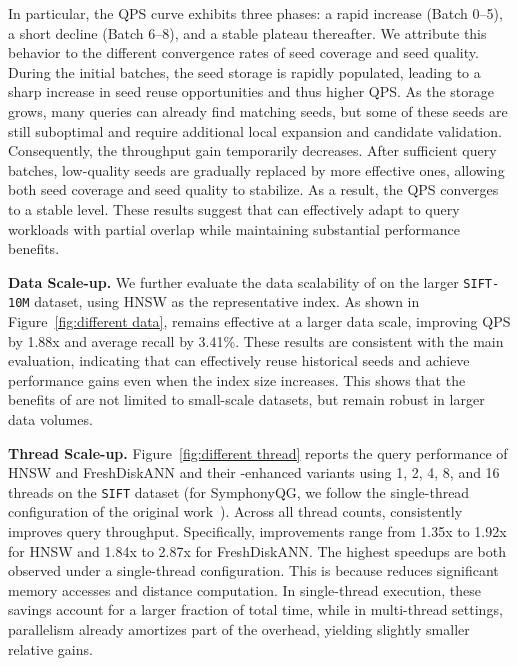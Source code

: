 In particular, the QPS curve exhibits three phases: a rapid increase (Batch 0--5), a short decline (Batch 6--8), and a stable plateau thereafter. We attribute this behavior to the different convergence rates of seed coverage and seed quality. During the initial batches, the seed storage is rapidly populated, leading to a sharp increase in seed reuse opportunities and thus higher QPS. As the storage grows, many queries can already find matching seeds, but some of these seeds are still suboptimal and require additional local expansion and candidate validation. Consequently, the throughput gain temporarily decreases. After sufficient query batches, low-quality seeds are gradually replaced by more effective ones, allowing both seed coverage and seed quality to stabilize. As a result, the QPS converges to a stable level. These results suggest that \system can effectively adapt to query workloads with partial overlap while maintaining substantial performance benefits.



\noindent \textbf{Data Scale-up.} We further evaluate the data scalability of \system on the larger \texttt{SIFT-10M} dataset, using HNSW as the representative index. As shown in Figure~\ref{fig:different data}, \system remains effective at a larger data scale, improving QPS by 1.88x and average recall by 3.41\%. These results are consistent with the main evaluation, indicating that \system can effectively reuse historical seeds and achieve performance gains even when the index size increases. This shows that the benefits of \system are not limited to small-scale datasets, but remain robust in larger data volumes.

\noindent \textbf{Thread Scale-up.} Figure~\ref{fig:different thread} reports the query performance of HNSW and FreshDiskANN and their \system-enhanced variants using 1, 2, 4, 8, and 16 threads on the \texttt{SIFT} dataset (for SymphonyQG, we follow the single-thread configuration of the original work~\cite{Gou2025}). Across all thread counts, \system consistently improves query throughput. Specifically, improvements range from 1.35x to 1.92x for HNSW and 1.84x to 2.87x for FreshDiskANN. The highest speedups are both observed under a single-thread configuration. This is because \system reduces significant memory accesses and distance computation. In single-thread execution, these savings account for a larger fraction of total time, while in multi-thread settings, parallelism already amortizes part of the overhead, yielding slightly smaller relative gains.

